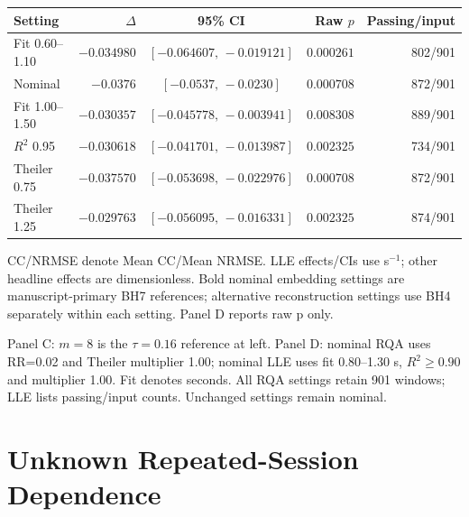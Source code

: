 \documentclass[conference,a4paper]{IEEEtran}
\begin{document}
\begin{table}[!tbp]
\begin{minipage}[t]{0.49\textwidth}
\begin{tabular*}{\linewidth}{@{\extracolsep{\fill}}lrcrr@{}}
\toprule
Setting & $\Delta$ & 95\% CI & Raw $p$ & Passing/input\\
\midrule
Fit 0.60--1.10 & $-0.034980$ & $[-0.064607,\,-0.019121]$ & $0.000261$ & 802/901\\
Nominal        & $-0.0376$   & $[-0.0537,\,-0.0230]$     & $0.000708$ & 872/901\\
Fit 1.00--1.50 & $-0.030357$ & $[-0.045778,\,-0.003941]$ & $0.008308$ & 889/901\\
$R^2$ 0.95     & $-0.030618$ & $[-0.041701,\,-0.013987]$ & $0.002325$ & 734/901\\
Theiler 0.75   & $-0.037570$ & $[-0.053698,\,-0.022976]$ & $0.000708$ & 872/901\\
Theiler 1.25   & $-0.029763$ & $[-0.056095,\,-0.016331]$ & $0.002325$ & 874/901\\
\bottomrule
\end{tabular*}
\end{minipage}

\par\smallskip
\raggedright
CC/NRMSE denote Mean CC/Mean NRMSE. LLE effects/CIs use s$^{-1}$; other headline effects are dimensionless. Bold nominal embedding settings are manuscript-primary BH7 references; alternative reconstruction settings use BH4 separately within each setting. Panel D reports raw p only.

\par\smallskip
\raggedright
Panel C: $m=8$ is the $\tau=0.16$ reference at left. Panel D: nominal RQA uses RR=0.02 and Theiler multiplier 1.00; nominal LLE uses fit 0.80--1.30 s, $R^2\geq0.90$ and multiplier 1.00. Fit denotes seconds. All RQA settings retain 901 windows; LLE lists passing/input counts. Unchanged settings remain nominal.

\end{table}

\FloatBarrier
\balance


\section{Unknown Repeated-Session Dependence}
\label{sec:supp_7}
\end{document}
